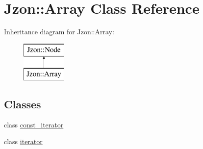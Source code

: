 \hypertarget{class_jzon_1_1_array}{\section{Jzon\-:\-:Array Class Reference}
\label{class_jzon_1_1_array}
}
Inheritance diagram for Jzon\-:\-:Array\-:\begin{figure}[H]
\begin{center}
\leavevmode
\includegraphics[height=2.000000cm]{class_jzon_1_1_array}
\end{center}
\end{figure}
\subsection*{Classes}
\begin{DoxyCompactItemize}
\item 
class \hyperlink{class_jzon_1_1_array_1_1const__iterator}{const\-\_\-iterator}
\item 
class \hyperlink{class_jzon_1_1_array_1_1iterator}{iterator}
\end{DoxyCompactItemize}
